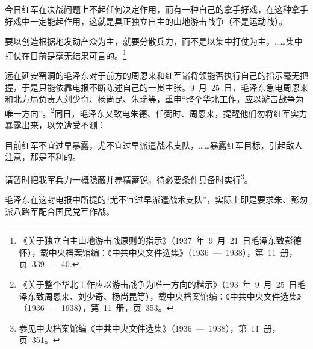 \begin{quoting}
今日红军在决战问题上不起任何决定作用，而有一种自己的拿手好戏，在这种拿手好戏中一定能起作用，这就是具正独立自主的山地游击战争（不是运动战）。

要以创造根据地发动产众为主，就要分散兵力，而不是以集中打仗为主，……集中打仗在目前是毫无结果可言的。\footnote{《关于独立自主山地游击战原则的指示》（1937~年~9~月~21~日毛泽东致彭德怀），载中央档案馆编：《中共中央文件选集》（1936~—~1938），第~11~册，页~339~—~40.}
\end{quoting}

远在延安窑洞的毛泽东对于前方的周恩来和红军诸将领能否执行自己的指示毫无把握，于是只能依靠电报不断陈述自己的一贯主张。9~月~25~日，毛泽东急电周恩来和北方局负责人刘少奇、杨尚昆、朱瑞等，重申“整个华北工作，应以游击战争为唯一方向”。\footnote{《关于整个华北工作应以游击战争为唯一方向的楷示》（193~年~9~月~25~日毛泽东致周恩来、刘少奇、杨尚昆等），载中央档案馆编：《中共中央文件选集》（1936~—~1938），第~11~册，页~353。}同日，毛泽东又致电朱德、任弼时、周恩来，提醒他们勿将红军实力暴露出来，以免遭受不测：

\begin{quoting}
目前红军不宜过早暴露，尤不宜过早派遣战术支队，……暴露红军目标，引起敌人注意，那是不利的。

请暂时把我军兵力一概隐蔽并养精蓄锐，待必要条件具备时实行\footnote{参见中央档案馆编《中共中央文件选集》（1936~—~1938），第~11~册，页~351。}。
\end{quoting}

毛泽东在这封电报中所提的“尤不宜过早派遣战术支队”，实际上即是要求朱、彭勿派八路军配合国民党军作战。

